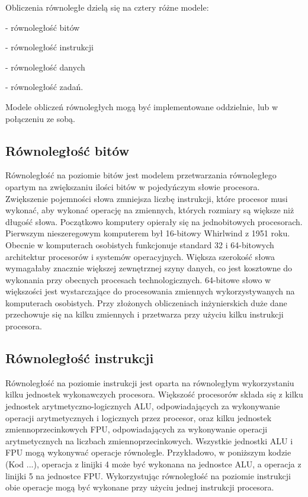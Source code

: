 Obliczenia równoległe dzielą się na cztery różne modele:

- równoległość bitów

- równoległość instrukcji

- równoległość danych

- równoległość zadań.

Modele obliczeń równoległych mogą być implementowane oddzielnie, lub w połączeniu ze sobą.

\subsection{Równoległość bitów}\label{sec:bitp}

Równoległość na poziomie bitów jest modelem przetwarzania równoległego opartym na zwiększaniu ilości bitów w pojedyńczym słowie procesora. Zwiększenie pojemności słowa zmniejsza liczbę instrukcji, które procesor musi wykonać, aby wykonać operację na zmiennych, których rozmiary są większe niż długość słowa.
Początkowo komputery opierały się na jednobitowych procesorach. Pierwszym nieszeregowym komputerem był 16-bitowy Whirlwind z 1951 roku. Obecnie w komputerach osobistych funkcjonuje standard 32 i 64-bitowych architektur procesorów i systemów operacyjnych. Większa szerokość słowa wymagałaby znacznie większej zewnętrznej szyny danych, co jest kosztowne do wykonania przy obecnych procesach technologicznych. 64-bitowe słowo w większości jest wystarczające do  procesowania zmiennych wykorzystywanych na komputerach osobistych. Przy złożonych obliczeniach inżynierskich duże dane przechowuje się na kilku zmiennych i przetwarza przy użyciu kilku instrukcji procesora.

\subsection{Równoległość instrukcji}\label{sec:instp}

Równoległość na poziomie instrukcji jest oparta na równoległym wykorzystaniu kilku jednostek wykonawczych procesora. Większość procesorów składa się z kilku jednostek arytmetyczno-logicznych ALU, odpowiadających za wykonywanie operacji arytmetycznych i logicznych przez procesor, oraz kilku jednostek zmiennoprzecinkowych FPU, odpowiadających za wykonywanie operacji arytmetycznych na liczbach zmiennoprzecinkowych. Wszystkie jednostki ALU i FPU mogą wykonywać operacje równolegle. Przykładowo, w poniższym kodzie (Kod ...), operacja z linijki 4 może być wykonana na jednostce ALU, a operacja z linijki 5 na jednostce FPU. Wykorzystując równoległość na poziomie instrukcji obie operacje mogą być wykonane przy użyciu jednej instrukcji procesora.

